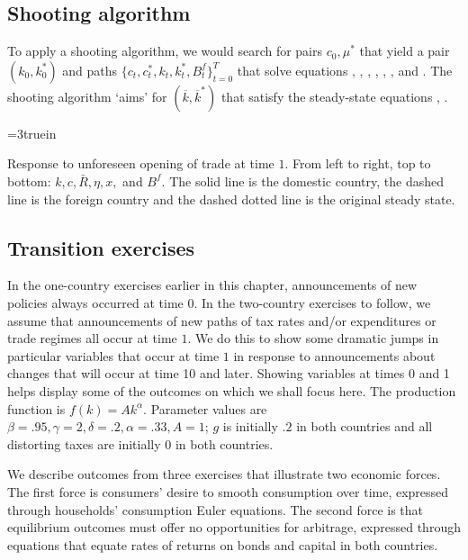 \subsection{Shooting algorithm}

To apply a shooting algorithm, we would search for pairs $c_0, \mu^*$ that yield a pair $(k_0, k_0^*)$ and paths  $\{c_t, c_t^*, k_t, k_t^*, B_t^f\}_{t=0}^T$ that solve equations
, , , , ,
, and .  The shooting algorithm  `aims' for   $(\overline k, \overline k^*)$ that satisfy the steady-state
equations , .




\centerline{\epsfxsize=3truein}
\caption{Response to unforeseen opening of trade at time $1$.
From left to right, top to bottom: $k, c, \bar R, \eta, x,$ and $B^f$. The solid line is the domestic country, the dashed line is the foreign
country and the dashed dotted line is the original
steady state.}
\endfigure
\subsection{Transition exercises}

 In the one-country exercises  earlier in this chapter, announcements of new policies always occurred at time $0$.
In the two-country exercises to follow, we assume that announcements of new paths of tax rates and/or expenditures or trade
regimes all occur at time $1$.  We do this to show some dramatic jumps in  particular variables that occur at
time $1$ in response to announcements about changes that will occur at time 10 and later.  Showing variables at times 0 and
1 helps display some of the outcomes on which we shall  focus here.
The production function is $f(k) = A k^\alpha$. Parameter values are $\beta=.95, \gamma =2, \delta = .2, \alpha = .33, A=1$;
 $g$ is initially
$.2$  in both countries and all distorting taxes are initially $0$ in both countries.

 We describe outcomes from three exercises that illustrate  two
economic forces. The first force  is consumers' desire to smooth
consumption over time, expressed through  households' consumption Euler equations.
The second  force is that equilibrium outcomes must offer no opportunities for arbitrage, expressed through  equations that
equate rates of returns on bonds and capital in both countries.

